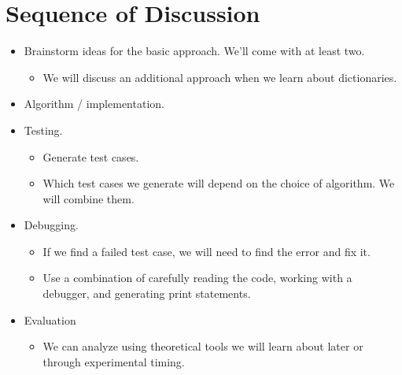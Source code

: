 \documentclass[letterpaper,10pt,english]{sphinxmanual}
\begin{document}
\section{Sequence of Discussion}
\label{\detokenize{lecture_notes/lec14_design_part1:sequence-of-discussion}}\begin{itemize}
\item {} 
Brainstorm ideas for the basic approach. We’ll come with at least
two.
\begin{itemize}
\item {} 
We will discuss an additional approach when we learn about
dictionaries.

\end{itemize}

\item {} 
Algorithm / implementation.

\item {} 
Testing.
\begin{itemize}
\item {} 
Generate test cases.

\item {} 
Which test cases we generate will depend on the choice of
algorithm. We will combine them.

\end{itemize}

\item {} 
Debugging.
\begin{itemize}
\item {} 
If we find a failed test case, we will need to find the error and
fix it.

\item {} 
Use a combination of carefully reading the code, working with a
debugger, and generating print statements.

\end{itemize}

\item {} 
Evaluation
\begin{itemize}
\item {} 
We can analyze using theoretical tools we will learn about
later or through experimental timing.

\end{itemize}

\end{itemize}
\end{document}
